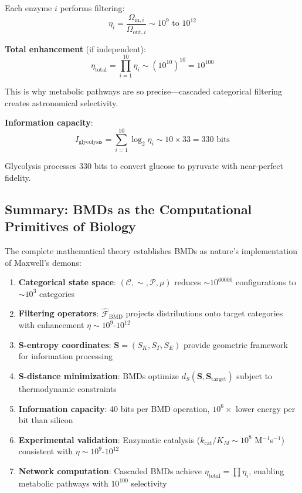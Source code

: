 \documentclass[11pt,a4paper]{article}
\begin{document}
Each enzyme $i$ performs filtering:
\begin{equation}
\eta_i = \frac{\Omega_{\text{in},i}}{\Omega_{\text{out},i}} \sim 10^9 \text{ to } 10^{12}
\end{equation}

\textbf{Total enhancement} (if independent):
\begin{equation}
\eta_{\text{total}} = \prod_{i=1}^{10} \eta_i \sim (10^{10})^{10} = 10^{100}
\end{equation}

This is why metabolic pathways are so precise—cascaded categorical filtering creates astronomical selectivity.

\textbf{Information capacity}:
\begin{equation}
I_{\text{glycolysis}} = \sum_{i=1}^{10} \log_2 \eta_i \sim 10 \times 33 = 330 \text{ bits}
\end{equation}

Glycolysis processes 330 bits to convert glucose to pyruvate with near-perfect fidelity.

\subsection{Summary: BMDs as the Computational Primitives of Biology}

The complete mathematical theory establishes BMDs as nature's implementation of Maxwell's demons:

\begin{enumerate}
\item \textbf{Categorical state space}: $(\mathcal{C}, \sim, \mathcal{P}, \mu)$ reduces $\sim 10^{60000}$ configurations to $\sim 10^3$ categories

\item \textbf{Filtering operators}: $\hat{\mathcal{F}}_{\text{BMD}}$ projects distributions onto target categories with enhancement $\eta \sim 10^{9}$-$10^{12}$

\item \textbf{S-entropy coordinates}: $\mathbf{S} = (S_K, S_T, S_E)$ provide geometric framework for information processing

\item \textbf{S-distance minimization}: BMDs optimize $d_S(\mathbf{S}, \mathbf{S}_{\text{target}})$ subject to thermodynamic constraints

\item \textbf{Information capacity}: 40 bits per BMD operation, $10^6\times$ lower energy per bit than silicon

\item \textbf{Experimental validation}: Enzymatic catalysis ($k_{\text{cat}}/K_M \sim 10^8$ M$^{-1}$s$^{-1}$) consistent with $\eta \sim 10^9$-$10^{12}$

\item \textbf{Network computation}: Cascaded BMDs achieve $\eta_{\text{total}} = \prod \eta_i$, enabling metabolic pathways with $10^{100}$ selectivity
\end{enumerate}
\end{document}
